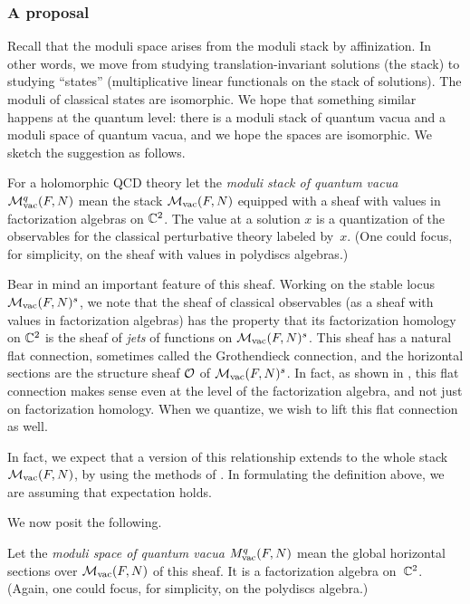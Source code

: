 \documentclass[11pt]{amsart}
\begin{document}
\subsubsection{A proposal}

Recall that the moduli space arises from the moduli stack by affinization.
In other words, we move from studying translation-invariant solutions (the stack) to studying ``states'' (multiplicative linear functionals on the stack of solutions).
The moduli of classical states are isomorphic.
We hope that something similar happens at the quantum level:
there is a moduli stack of quantum vacua and a moduli space of quantum vacua,
and we hope the spaces are isomorphic.
We sketch the suggestion as follows.

\begin{dfn}
For a holomorphic QCD theory let the {\em moduli stack of quantum vacua} $\mathcal M^q_{\rm vac}(F,N)$ mean the stack $\mathcal M_{\rm vac}(F,N)$ equipped with a sheaf with values in factorization algebras on $\mathbb C^2$.
The value at a solution $x$ is a quantization of the observables for the classical perturbative theory labeled by~$x$.
(One could focus, for simplicity, on the sheaf with values in polydiscs algebras.)
\end{dfn}

Bear in mind an important feature of this sheaf.
Working on the stable locus $\mathcal M_{\rm vac}(F,N)^{s}$, 
we note that the sheaf of classical observables (as a sheaf with values in factorization algebras) has the property that its factorization homology on $\mathbb C^2$ is the sheaf of {\em jets} of functions on $\mathcal M_{\rm vac}(F,N)^{s}$.
This sheaf has a natural flat connection, sometimes called the Grothendieck connection, and the horizontal sections are the structure sheaf $\mathcal O$ of $\mathcal M_{\rm vac}(F,N)^{s}$.
In fact, as shown in \cite{GGW, WilThesis}, this flat connection makes sense even at the level of the factorization algebra,
and not just on factorization homology.
When we quantize, we wish to lift this flat connection as well.

In fact, we expect that a version of this relationship extends to the whole stack $\mathcal M_{\rm vac}(F,N)$,
by using the methods of \cite{CPTVV}.
In formulating the definition above, we are assuming that expectation holds. 

We now posit the following.

\begin{dfn}
Let the {\em moduli space of quantum vacua} $M^q_{\rm vac}(F,N)$ mean the global horizontal sections over $\mathcal M_{\rm vac}(F,N)$ of this sheaf. 
It is a factorization algebra on~$\mathbb C^2$.
(Again, one could focus, for simplicity, on the polydiscs algebra.)
\end{dfn}
\end{document}

